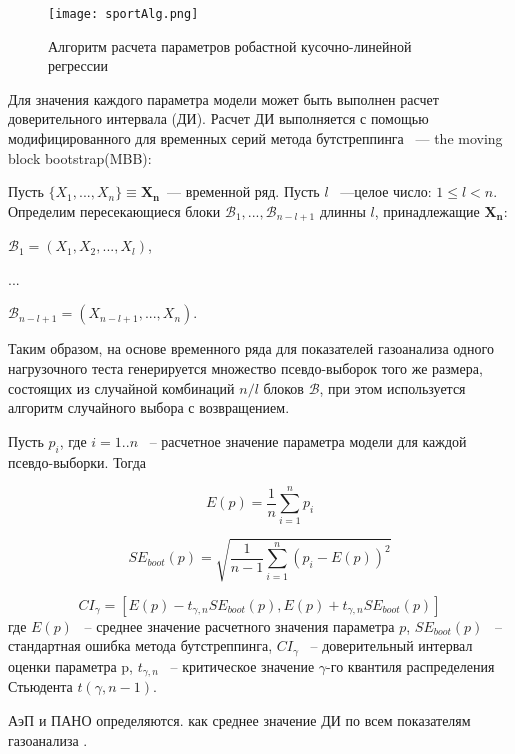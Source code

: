 \begin{figure}[!ht]
	\centering
	\texttt{[image: sportAlg.png]}
	\caption{Алгоритм расчета параметров робастной кусочно-линейной регрессии } 
\end{figure}

Для значения каждого параметра модели может быть выполнен расчет доверительного интервала (ДИ). Расчет ДИ выполняется с помощью модифицированного для временных серий метода бутстреппинга \cite{efron1988}~--- the moving block bootstrap(MBB): 

Пусть $\{X_{1},...,X_{n}\} \equiv \mathbf{X_{n}}$~--- временной ряд. Пусть $l$ ~---целое число: $1\le l<n$. Определим пересекающиеся блоки $\mathcal{B}_{1},...,\mathcal{B}_{n-l+1}$ длинны $l$, принадлежащие $\mathbf{X_{n}}$:

$\mathcal{B}_{1}=(X_{1},X_{2},...,X_{l})$,

...

$\mathcal{B}_{n-l+1}=(X_{n-l+1},...,X_{n})$.

Таким образом, на основе временного ряда для показателей газоанализа одного нагрузочного теста генерируется множество псевдо-выборок того же размера,
состоящих из случайной комбинаций $n/l$ блоков $\mathcal{B}$, при этом используется алгоритм случайного выбора с возвращением.

Пусть \(p_{i}\), где \(i=1..n\) ~-- расчетное значение параметра модели для каждой псевдо-выборки. Тогда

\begin{equation}
E(p)=\frac{1}{n}\sum_{i=1}^n p_{i}
\end{equation}

\begin{equation}
SE_{boot}(p)=\sqrt{\frac{1}{n-1}\sum_{i=1}^{n}\left(p_{i}-E(p)\right)^{2}}
\end{equation}

\begin{equation}
CI_{\gamma} = \left[E(p)-t_{\gamma,n}SE_{boot}(p), E(p)+t_{\gamma,n}SE_{boot}(p)\right]
\end{equation}
где \(E(p)\) ~-- среднее значение расчетного значения параметра \(p\), \(SE_{boot}(p)\) ~-- стандартная ошибка метода бутстреппинга, \(CI_{\gamma}\) ~-- доверительный интервал оценки параметра p, \(t_{\gamma,n}\) ~-- критическое значение \(\gamma\)-го квантиля распределения Стьюдента \(t(\gamma, n-1)\).

АэП и ПАНО определяются. как среднее значение ДИ по всем показателям газоанализа \cite{GolovIt2017}.

